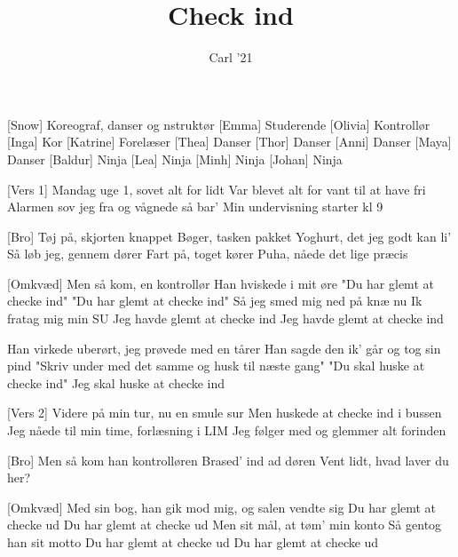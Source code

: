 \documentclass[a4paper,11pt]{article}
\title{Check ind}
\author{Carl '21}
\begin{document}
\maketitle

\begin{roles}
[Snow] Koreograf, danser og nstruktør
[Emma] Studerende
[Olivia] Kontrollør
[Inga] Kor
[Katrine] Forelæser
[Thea] Danser
[Thor] Danser
[Anni] Danser
[Maya] Danser
[Baldur] Ninja
[Lea] Ninja
[Minh] Ninja
[Johan] Ninja
\end{roles}

\begin{song}

[Vers 1] Mandag uge 1, sovet alt for lidt
    Var blevet alt for vant til at have fri
    Alarmen sov jeg fra og vågnede så bar'
    Min undervisning starter kl 9

[Bro] Tøj på, skjorten knappet
    Bøger, tasken pakket
    Yoghurt, det jeg godt kan li'
    Så løb jeg, gennem dører
    Fart på, toget kører
    Puha, nåede det lige præcis

[Omkvæd] Men så kom, en kontrollør
    Han hviskede i mit øre
    "Du har glemt at checke ind"
    "Du har glemt at checke ind"
    Så jeg smed mig ned på knæ nu
    Ik fratag mig min SU
    Jeg havde glemt at checke ind
    Jeg havde glemt at checke ind

    Han virkede uberørt, jeg prøvede med en tårer
    Han sagde den ik' går og tog sin pind
    "Skriv under med det samme og husk til næste gang"
    "Du skal huske at checke ind"
    Jeg skal huske at checke ind


[Vers 2] Videre på min tur, nu en smule sur
    Men huskede at checke ind i bussen
    Jeg nåede til min time, forlæsning i LIM
    Jeg følger med og glemmer alt forinden

[Bro] Men så kom han kontrolløren
    Brased' ind ad døren
    Vent lidt, hvad laver du her?

[Omkvæd] Med sin bog, han gik mod mig, og salen vendte sig
 Du har glemt at checke ud
    Du har glemt at checke ud
 Men sit mål, at tøm' min konto
    Så gentog han sit motto
 Du har glemt at checke ud
    Du har glemt at checke ud


\end{song}
\end{document}
